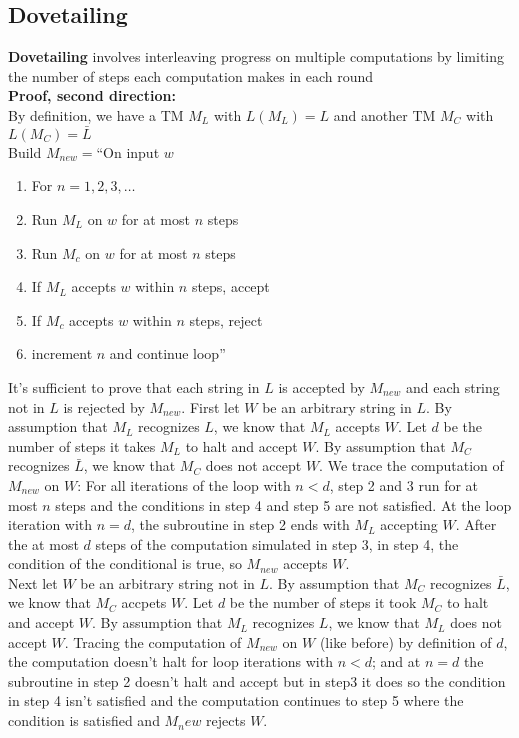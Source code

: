 \documentclass{article}
\begin{document}
\subsection{Dovetailing}
\textbf{Dovetailing} involves interleaving progress on multiple computations by limiting the number of steps each computation makes in each round\\
\textbf{Proof, second direction:} \\
By definition, we have a TM $M_L$ with $L(M_L)=L$ and another TM $M_C$ with $L(M_C)=\bar L$\\
Build $M_{new}=$``On input $w$
\begin{enumerate}
    \item For $n=1,2,3,\dots$
    \item \hspace*{0.25in} Run $M_L$ on $w$ for at most $n$ steps
    \item \hspace*{0.25in} Run $M_c$ on $w$ for at most $n$ steps
    \item \hspace*{0.25in} If $M_L$ accepts $w$ within $n$ steps, accept
    \item \hspace*{0.25in} If $M_c$ accepts $w$ within $n$ steps, reject
    \item \hspace*{0.25in} increment $n$ and continue loop''
\end{enumerate}
It's sufficient to prove that each string in $L$ is accepted by $M_{new}$ and each string not in $L$ is rejected by $M_{new}$. First let $W$ be an arbitrary string in $L$. By assumption that $M_L$ recognizes $L$, we know that $M_L$ accepts $W$. Let $d$ be the number of steps it takes $M_L$ to halt and accept $W$. By assumption that $M_C$ recognizes $\bar L$, we know that $M_C$ does not accept $W$. We trace the computation of $M_{new}$ on $W$: For all iterations of the loop with $n<d$, step 2 and 3 run for at most $n$ steps and the conditions in step 4 and step 5 are not satisfied. At the loop iteration with $n=d$, the subroutine in step 2 ends with $M_L$ accepting $W$. After the at most $d$ steps of the computation simulated in step 3, in step 4, the condition of the conditional is true, so $M_{new}$ accepts $W$.\\
Next let $W$ be an arbitrary string not in $L$. By assumption that $M_C$ recognizes $\bar L$, we know that $M_C$ accpets $W$. Let $d$ be the number of steps it took $M_C$ to halt and accept $W$. By assumption that $M_L$ recognizes $L$, we know that $M_L$ does not accept $W$. Tracing the computation of $M_{new}$ on $W$ (like before) by definition of $d$, the computation doesn't halt for loop iterations with $n<d$; and at $n=d$ the subroutine in step 2 doesn't halt and accept but in step3 it does so the condition in step 4 isn't satisfied and the computation continues to step 5 where the condition is satisfied and $M_new$ rejects $W$.
\end{document}
